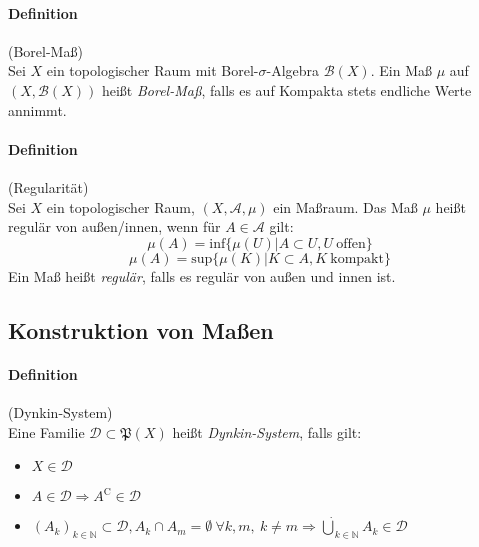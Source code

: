 \documentclass[12pt,a4paper,fleqn]{article}
\begin{document}
\paragraph{Definition}(Borel-Maß)\\
Sei $X$ ein topologischer Raum mit Borel-$\sigma$-Algebra $\mathcal{B}(X)$. Ein Maß $\mu$ auf $(X, \mathcal{B}(X))$ heißt \textit{Borel-Maß}, falls es auf Kompakta stets endliche Werte annimmt.

\paragraph{Definition}(Regularität)\\
Sei $X$ ein topologischer Raum, $(X, \mathcal{A}, \mu)$ ein Maßraum. Das Maß $\mu$ heißt regulär von außen/innen, wenn für $A \in \mathcal{A}$ gilt:
\begin{displaymath}
\mu (A) = \text{inf}\{\mu(U) \vert A \subset U, U\ \text{offen}\}
\end{displaymath}
\begin{displaymath}
\mu (A) = \text{sup}\{\mu(K) \vert K \subset A, K\ \text{kompakt}\}
\end{displaymath}
Ein Maß heißt \textit{regulär}, falls es regulär von außen und innen ist.

\subsection{Konstruktion von Maßen}

\paragraph{Definition}(Dynkin-System)\\
Eine Familie $\mathcal{D} \subset \mathfrak{P}(X)$ heißt \textit{Dynkin-System}, falls gilt:
\begin{itemize}
\item$X \in \mathcal{D}$
\item$A \in \mathcal{D} \Rightarrow A^\mathrm{C} \in \mathcal{D}$
\item$(A_k)_{k \in \mathbb{N}} \subset \mathcal{D}, A_k \cap A_m = \emptyset\ \forall k, m,\ k \not = m \Rightarrow \dot\bigcup_{k \in \mathbb{N}} A_k \in \mathcal{D}$
\end{itemize}
\end{document}
